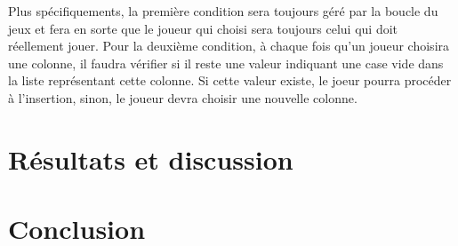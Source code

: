 \documentclass[12pt]{article}
\begin{document}
Plus spécifiquements, la première condition sera toujours géré par la boucle du jeux  et fera en sorte que le joueur qui choisi sera toujours celui qui doit réellement jouer. Pour la deuxième condition, à chaque fois qu'un joueur choisira une colonne, il faudra vérifier si il reste une valeur indiquant une case vide dans la liste représentant cette colonne. Si cette valeur existe, le joeur pourra procéder à l'insertion, sinon, le joueur devra choisir une nouvelle colonne. 

\section*{Résultats et discussion}

\section*{Conclusion}
\end{document}
